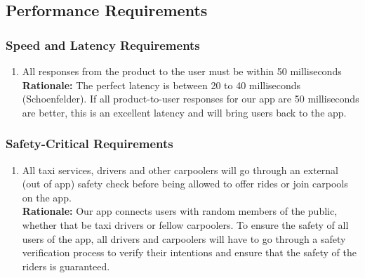 \documentclass[]{article}
\begin{document}

\subsection{Performance Requirements}
\label{sub:performance_requirements}

\subsubsection{Speed and Latency Requirements}
\label{ssub:speed_and_latency_requirements}
\begin{enumerate}[{PR-SL}1. ]
	\item All responses from the product to the user must be within 50 milliseconds \\
	{\bf Rationale:} The perfect latency is between 20 to 40 milliseconds (Schoenfelder). If all product-to-user responses for our app are 50 milliseconds are better, this is an excellent latency and will bring users back to the app.
\end{enumerate}

\subsubsection{Safety-Critical Requirements}
\label{ssub:safety_critical_requirements}
\begin{enumerate}[{PR-SC}1. ]
	\item All taxi services, drivers and other carpoolers will go through an external (out of app) safety check before being allowed to offer rides or join carpools on the app. \\
	{\bf Rationale:} Our app connects users with random members of the public, whether that be taxi drivers or fellow carpoolers. To ensure the safety of all users of the app, all drivers and carpoolers will have to go through a safety verification process to verify their intentions and ensure that the safety of the riders is guaranteed.
\end{enumerate}
\end{document}
